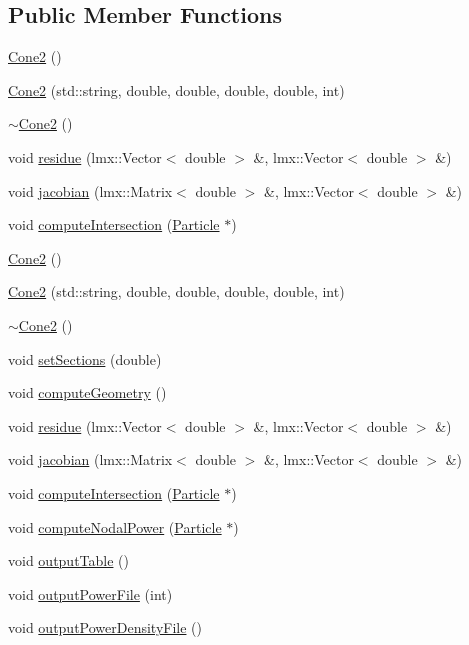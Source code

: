 \subsection*{Public Member Functions}
\begin{DoxyCompactItemize}
\item 
\hyperlink{classCone2_ad99f90e043c4aa4cc1e4012aafd9a909}{Cone2} ()
\item 
\hyperlink{classCone2_a65867efad22fe7b708dd76b7a2621577}{Cone2} (std\-::string, double, double, double, double, int)
\item 
\hyperlink{classCone2_add4b118b935f03db10ed1db95809034b}{$\sim$\-Cone2} ()
\item 
void \hyperlink{classCone2_a07d48d198db7ccb9d72f17e1b4f0c154}{residue} (lmx\-::\-Vector$<$ double $>$ \&, lmx\-::\-Vector$<$ double $>$ \&)
\item 
void \hyperlink{classCone2_a94d852542a6c22427333b484f30658c2}{jacobian} (lmx\-::\-Matrix$<$ double $>$ \&, lmx\-::\-Vector$<$ double $>$ \&)
\item 
void \hyperlink{classCone2_ad62643bcb7573d63116d940c8a064c46}{compute\-Intersection} (\hyperlink{classParticle}{Particle} $\ast$)
\item 
\hyperlink{classCone2_ad99f90e043c4aa4cc1e4012aafd9a909}{Cone2} ()
\item 
\hyperlink{classCone2_a65867efad22fe7b708dd76b7a2621577}{Cone2} (std\-::string, double, double, double, double, int)
\item 
\hyperlink{classCone2_add4b118b935f03db10ed1db95809034b}{$\sim$\-Cone2} ()
\item 
void \hyperlink{classCone2_a7aeaee918b84b78b5b00f9572bedd349}{set\-Sections} (double)
\item 
void \hyperlink{classCone2_aa79cd275d279459beb8fa668cad2aa55}{compute\-Geometry} ()
\item 
void \hyperlink{classCone2_a07d48d198db7ccb9d72f17e1b4f0c154}{residue} (lmx\-::\-Vector$<$ double $>$ \&, lmx\-::\-Vector$<$ double $>$ \&)
\item 
void \hyperlink{classCone2_a94d852542a6c22427333b484f30658c2}{jacobian} (lmx\-::\-Matrix$<$ double $>$ \&, lmx\-::\-Vector$<$ double $>$ \&)
\item 
void \hyperlink{classCone2_ad62643bcb7573d63116d940c8a064c46}{compute\-Intersection} (\hyperlink{classParticle}{Particle} $\ast$)
\item 
void \hyperlink{classCone2_a28a2c5c4cfba12b2ae005547e5bab5a2}{compute\-Nodal\-Power} (\hyperlink{classParticle}{Particle} $\ast$)
\item 
void \hyperlink{classCone2_a89b20ddec7e0a6b1bd9478a8036c9ad0}{output\-Table} ()
\item 
void \hyperlink{classCone2_a947c9976494227e12730843c77a9b241}{output\-Power\-File} (int)
\item 
void \hyperlink{classCone2_af259aae6fd151e82482ee9232b63af31}{output\-Power\-Density\-File} ()
\end{DoxyCompactItemize}
